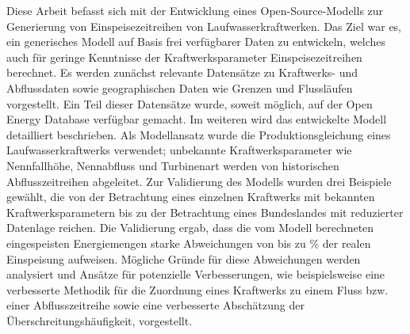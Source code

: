 Diese Arbeit befasst sich mit der Entwicklung eines Open-Source-Modells zur Generierung von Einspeisezeitreihen von Laufwasserkraftwerken. Das Ziel war es, ein generisches Modell auf Basis frei verfügbarer Daten zu entwickeln, welches auch für geringe Kenntnisse der Kraftwerksparameter Einspeisezeitreihen berechnet. Es werden zunächst relevante Datensätze zu Kraftwerks- und Abflussdaten sowie geographischen Daten wie Grenzen und Flussläufen vorgestellt. Ein Teil dieser Datensätze wurde, soweit möglich, auf der Open Energy Database verfügbar gemacht. Im weiteren wird das entwickelte Modell detailliert beschrieben. Als Modellansatz wurde die Produktionsgleichung eines Laufwasserkraftwerks verwendet; unbekannte Kraftwerksparameter wie Nennfallhöhe, Nennabfluss und Turbinenart werden von historischen Abflusszeitreihen abgeleitet. Zur Validierung des Modells wurden drei Beispiele gewählt, die von der Betrachtung eines einzelnen Kraftwerks mit bekannten Kraftwerksparametern bis zu der Betrachtung eines Bundeslandes mit reduzierter Datenlage reichen. Die Validierung ergab, dass die vom Modell berechneten eingespeisten Energiemengen starke Abweichungen von bis zu \unit[50]{\%} der realen Einspeisung aufweisen. Mögliche Gründe für diese Abweichungen werden analysiert und Ansätze für potenzielle Verbesserungen, wie beispielsweise eine verbesserte Methodik für die Zuordnung eines Kraftwerks zu einem Fluss bzw. einer Abflusszeitreihe sowie eine verbesserte Abschätzung der Überschreitungshäufigkeit, vorgestellt.
